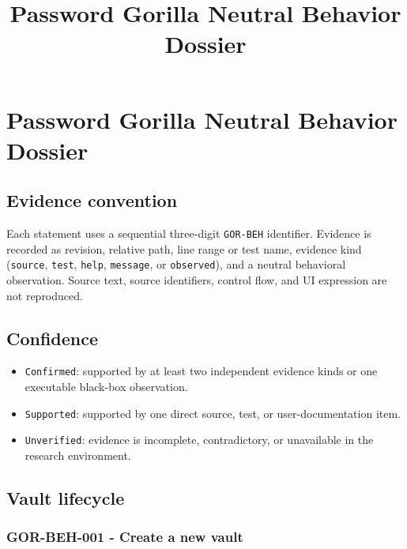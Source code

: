 \documentclass[
  letterpaper,
]{article}
\title{Password Gorilla Neutral Behavior Dossier}
\author{}
\date{}
\newcommand{\passthrough}[1]{#1}
\providecommand{\tightlist}{%
  \setlength{\itemsep}{0pt}\setlength{\parskip}{0pt}}
\begin{document}
\maketitle

{
\setcounter{tocdepth}{3}
\tableofcontents
}
\section{Password Gorilla Neutral Behavior Dossier}\label{password-gorilla-neutral-behavior-dossier}

\subsection{Evidence convention}\label{evidence-convention}

Each statement uses a sequential three-digit \passthrough{\lstinline!GOR-BEH!} identifier. Evidence is recorded as
revision, relative path, line range or test name, evidence kind (\passthrough{\lstinline!source!},
\passthrough{\lstinline!test!}, \passthrough{\lstinline!help!}, \passthrough{\lstinline!message!}, or
\passthrough{\lstinline!observed!}), and a neutral behavioral observation. Source text, source identifiers, control
flow, and UI expression are not reproduced.

\subsection{Confidence}\label{confidence}

\begin{itemize}
\tightlist
\item
  \passthrough{\lstinline!Confirmed!}: supported by at least two independent evidence kinds or one executable black-box
  observation.
\item
  \passthrough{\lstinline!Supported!}: supported by one direct source, test, or user-documentation item.
\item
  \nolinkurl{Unverified}: evidence is incomplete, contradictory, or unavailable in the research environment.
\end{itemize}

\subsection{Vault lifecycle}\label{vault-lifecycle}

\subsubsection{GOR-BEH-001 - Create a new vault}\label{gor-beh-001---create-a-new-vault}
\end{document}
